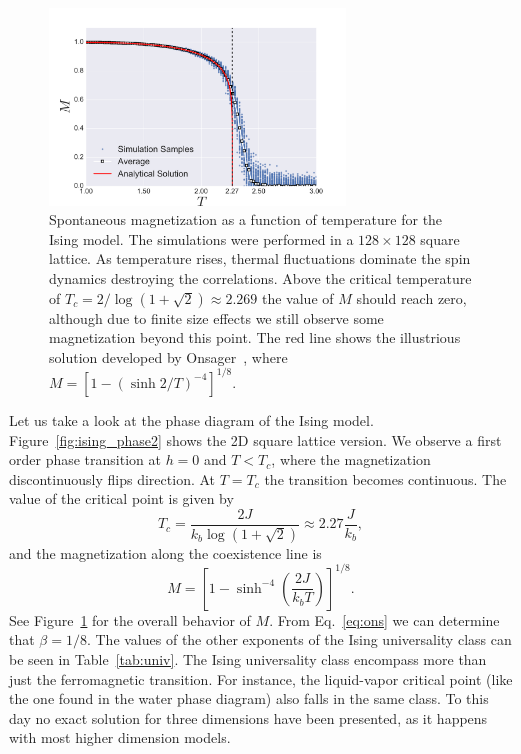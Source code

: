 \begin{figure}[t]
\begin{center}
    \includegraphics[width=0.7\textwidth]{chapters/ch2-crit/figs/ising_phase}
\end{center}
\caption{Spontaneous magnetization as a function of temperature for the Ising
    model. The simulations were performed in a $128\times128$ square lattice.
    As temperature rises, thermal fluctuations dominate the spin dynamics
    destroying the correlations. Above the critical temperature of
    $T_c=2/\log(1+\sqrt{2})\approx 2.269$ the value of $M$ should reach zero,
    although due to finite size effects we still observe some magnetization
    beyond this point. The red line shows the illustrious solution
    developed by Onsager~\cite{Onsager1944}, where
    $M={[1-{(\sinh{2/T})}^{-4}]}^{1/8}$.}
\label{fig:ising_phase}
\end{figure}

Let us take a look at the phase diagram of the Ising model.
Figure~\ref{fig:ising_phase2} shows the 2D square lattice version. We observe a
first order phase transition at $h=0$ and $T<T_c$, where the magnetization
discontinuously flips direction. At $T=T_c$ the transition becomes continuous.
The value of the critical point is given by
\begin{equation}
    T_{c}=
    \frac{2J}{k_{b}\log\left(1+\sqrt{2}\right)}
    \approx2.27\frac{J}{k_{b}},
\end{equation}
and the magnetization along the coexistence line is~\cite{Yang1952}
\begin{equation}
    \label{eq:ons}
    M={\left[1-\sinh^{-4}\left(\frac{2J}{k_{b}T}\right)\right]}^{1/8}.
\end{equation}
See Figure~\ref{fig:ising_phase} for the overall behavior of $M$.
From Eq.~\ref{eq:ons} we can determine that $\beta=1/8$. The values of the
other exponents of the Ising universality class can be seen in
Table~\ref{tab:univ}. The Ising universality class encompass more than just the
ferromagnetic transition. For instance, the liquid-vapor critical point (like
the one found in the water phase diagram) also falls in the same class. To this
day no exact solution for three dimensions have been presented, as it happens
with most higher dimension models.

